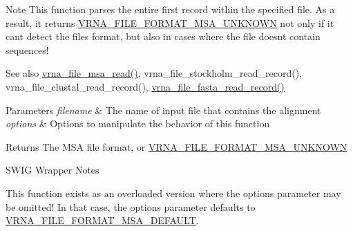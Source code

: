 \begin{DoxyNote}{Note}
This function parses the entire first record within the specified file. As a result, it returns \mbox{\hyperlink{group__file__formats__msa_gabdc948f547e550125de3e7c65878400c}{V\+R\+N\+A\+\_\+\+F\+I\+L\+E\+\_\+\+F\+O\+R\+M\+A\+T\+\_\+\+M\+S\+A\+\_\+\+U\+N\+K\+N\+O\+WN}} not only if it can\textquotesingle{}t detect the file\textquotesingle{}s format, but also in cases where the file doesn\textquotesingle{}t contain sequences!
\end{DoxyNote}
\begin{DoxySeeAlso}{See also}
\mbox{\hyperlink{group__file__formats__msa_gad02d5d12bda54611c915a1019323b7be}{vrna\+\_\+file\+\_\+msa\+\_\+read()}}, vrna\+\_\+file\+\_\+stockholm\+\_\+read\+\_\+record(), vrna\+\_\+file\+\_\+clustal\+\_\+read\+\_\+record(), \mbox{\hyperlink{group__file__formats_ga8cfb7e271efc9e1f34640acb85475639}{vrna\+\_\+file\+\_\+fasta\+\_\+read\+\_\+record()}}
\end{DoxySeeAlso}

\begin{DoxyParams}{Parameters}
{\em filename} & The name of input file that contains the alignment \\
\hline
{\em options} & Options to manipulate the behavior of this function \\
\hline
\end{DoxyParams}
\begin{DoxyReturn}{Returns}
The M\+SA file format, or \mbox{\hyperlink{group__file__formats__msa_gabdc948f547e550125de3e7c65878400c}{V\+R\+N\+A\+\_\+\+F\+I\+L\+E\+\_\+\+F\+O\+R\+M\+A\+T\+\_\+\+M\+S\+A\+\_\+\+U\+N\+K\+N\+O\+WN}}
\end{DoxyReturn}
\begin{DoxyRefDesc}{S\+W\+I\+G Wrapper Notes}
\item[\mbox{\hyperlink{wrappers__wrappers000077}{S\+W\+I\+G Wrapper Notes}}]This function exists as an overloaded version where the {\ttfamily options} parameter may be omitted! In that case, the {\ttfamily options} parameter defaults to \mbox{\hyperlink{group__file__formats__msa_ga4acc255373831856a8417b68de8a94c0}{V\+R\+N\+A\+\_\+\+F\+I\+L\+E\+\_\+\+F\+O\+R\+M\+A\+T\+\_\+\+M\+S\+A\+\_\+\+D\+E\+F\+A\+U\+LT}}. \end{DoxyRefDesc}
\mbox{\label{group__file__formats__msa_gaccca55b71d34def88e18ed9a51ccb2bf}} 
